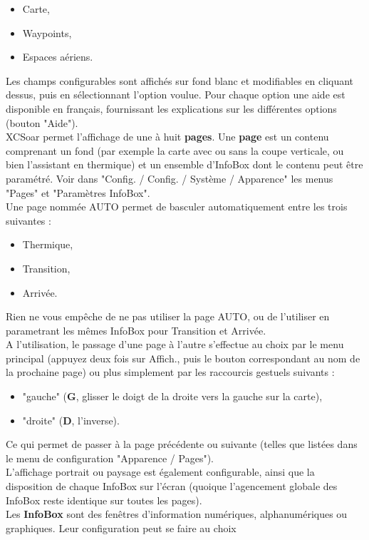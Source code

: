 \documentclass{article}
\begin{document}
\begin{itemize}
\item Carte,
\item Waypoints,
\item Espaces aériens.
\end{itemize}
Les champs configurables sont affichés sur fond blanc et modifiables en cliquant dessus, puis en sélectionnant l'option voulue. Pour chaque option une aide est disponible en français, fournissant les explications sur les différentes options (bouton "Aide").\\
%
\newline
%
XCSoar permet l'affichage de une à huit \textbf{pages}. Une \textbf{page} est un contenu comprenant un fond (par exemple la carte avec ou sans la coupe verticale, ou bien l'assistant en thermique) et un ensemble d'InfoBox dont le contenu peut être paramétré. Voir dans "Config. / Config. / Système / Apparence" les menus "Pages" et "Paramètres InfoBox".\\
Une page nommée AUTO permet de basculer automatiquement entre les trois suivantes :
\begin{itemize}
\item Thermique,
\item Transition,
\item Arrivée.
\end{itemize}
Rien ne vous empêche de ne pas utiliser la page AUTO, ou de l'utiliser en parametrant les mêmes InfoBox pour Transition et Arrivée.\\
A l'utilisation, le passage d'une page à l'autre s'effectue au choix par le menu principal (appuyez deux fois sur Affich., puis le bouton correspondant au nom de la prochaine page) ou plus simplement par les raccourcis gestuels suivants :
\begin{itemize}
\item "gauche" (\textbf{G}, glisser le doigt de la droite vers la gauche sur la carte),
\item "droite" (\textbf{D}, l'inverse).
\end{itemize}
Ce qui permet de passer à la page précédente ou suivante (telles que listées dans le menu de configuration "Apparence / Pages").\\
%
L'affichage portrait ou paysage est également configurable, ainsi que la disposition de chaque InfoBox sur l'écran (quoique l'agencement globale des InfoBox reste identique sur toutes les pages).\\
%
\newline
%
Les \textbf{InfoBox} sont des fenêtres d'information numériques, alphanumériques ou graphiques. Leur configuration peut se faire au choix 
\end{document}
